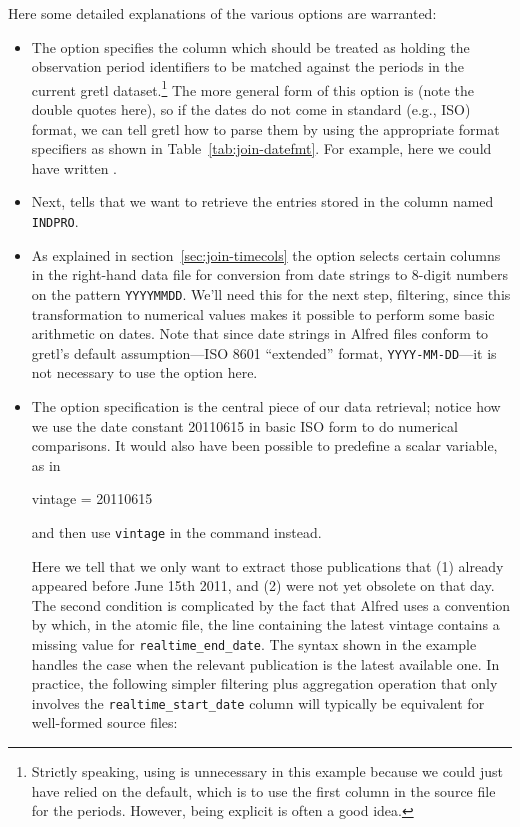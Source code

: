 Here some detailed explanations of the various options are warranted: 
\begin{itemize}
\item The  option specifies the column which should be
  treated as holding the observation period identifiers to be matched
  against the periods in the current gretl dataset.\footnote{Strictly
    speaking, using  is unnecessary in this example
    because we could just have relied on the default, which is to use
    the first column in the source file for the periods. However,
    being explicit is often a good idea.}  The more general form of
  this option is  (note the double
  quotes here), so if the dates do not come in standard (e.g., ISO)
  format, we can tell gretl how to parse them by using the appropriate
  format specifiers as shown in Table~\ref{tab:join-datefmt}.  For
  example, here we could have written
  .
\item Next,  tells  that we want to
  retrieve the entries stored in the column named \texttt{INDPRO}.
\item As explained in section~\ref{sec:join-timecols} the
   option selects certain columns in the right-hand
  data file for conversion from date strings to 8-digit numbers on the
  pattern \texttt{YYYYMMDD}.  We'll need this for the next step,
  filtering, since this transformation to numerical values makes it
  possible to perform some basic arithmetic on dates.  Note that since
  date strings in Alfred files conform to gretl's default
  assumption---ISO 8601 ``extended'' format, \texttt{YYYY-MM-DD}---it
  is not necessary to use the  option here.
\item The  option specification is the central piece of
  our data retrieval; notice how we use the date constant 20110615 in
  basic ISO form to do numerical comparisons. It would also have been
  possible to predefine a scalar variable, as in
 \begin{code}
   vintage = 20110615
 \end{code}
 and then use \texttt{vintage} in the  command instead.

  Here we tell  that we only want to extract those
  publications that (1) already appeared before June 15th 2011, and
  (2) were not yet obsolete on that day. The second condition is
  complicated by the fact that Alfred uses a convention by which, in
  the atomic file, the line containing the latest vintage contains a
  missing value for \texttt{realtime\_end\_date}. The syntax shown in
  the example handles the case when the relevant publication is the
  latest available one. In practice, the following simpler filtering
  plus aggregation operation that only involves the
  \verb|realtime_start_date| column will typically be equivalent for
  well-formed source files: 
\end{itemize}
